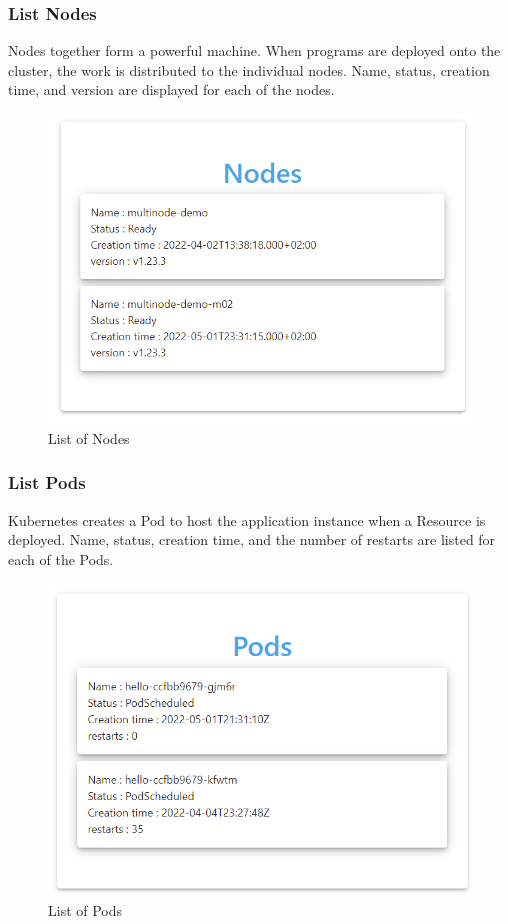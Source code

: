 \subsubsection{List Nodes}
Nodes together form a powerful machine. When programs are deployed onto the cluster, the work is distributed to the individual nodes. Name, status, creation time, and version are displayed for each of the nodes.
\begin{figure}[H]
	\centering
	\includegraphics[width=130mm]{images/nodes.png}
	\caption{List of Nodes}
	\label{ssec:list-of-nodes}
\end{figure}

\subsubsection{List Pods}
Kubernetes creates a Pod to host the application instance when a Resource is deployed. Name, status, creation time, and the number of restarts are listed for each of the Pods.
\begin{figure}[H]
	\centering
	\includegraphics[width=130mm]{images/pods.png}
	\caption{List of Pods}
	\label{ssec:list-of-pods}
\end{figure}

